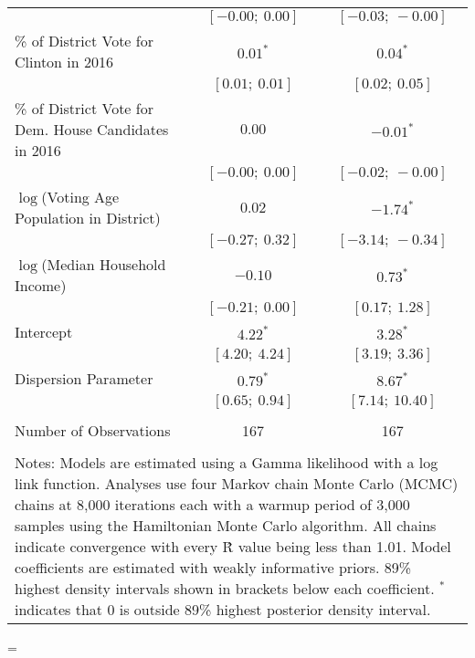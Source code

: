 \begin{table}
\begin{center}
{{\begin{tabular}{@{\extracolsep{5pt}}l c c }
          & $[-0.00;\ 0.00]$  & $[-0.03;\ -0.00]$ \\
\quad \% of District Vote for Clinton in 2016  & $0.01^{*}$        & $0.04^{*}$        \\
          & $[0.01;\ 0.01]$   & $[0.02;\ 0.05]$   \\
\quad \% of District Vote for Dem. House Candidates in 2016  & $0.00$            & $-0.01^{*}$       \\
          & $[-0.00;\ 0.00]$  & $[-0.02;\ -0.00]$ \\
\quad $\log$(Voting Age Population in District)   & $0.02$            & $-1.74^{*}$       \\
          & $[-0.27;\ 0.32]$  & $[-3.14;\ -0.34]$ \\
\quad $\log$(Median Household Income)    & $-0.10$           & $0.73^{*}$        \\
          & $[-0.21;\ 0.00]$  & $[0.17;\ 1.28]$   \\
\quad Intercept         & $4.22^{*}$        & $3.28^{*}$        \\
          & $[4.20;\ 4.24]$   & $[3.19;\ 3.36]$   \\
Dispersion Parameter     & $0.79^{*}$        & $8.67^{*}$        \\
          & $[0.65;\ 0.94]$   & $[7.14;\ 10.40]$  \\
\midrule  \\[-1.8ex]
Number of Observations & 167 & 167 \\
\bottomrule  \\[-1.8ex]
\multicolumn{3}{p{\linewidth}}{Notes: Models are estimated using a Gamma likelihood with a log link function. Analyses use four Markov chain Monte Carlo (MCMC) chains at 8,000 iterations each with a warmup period of 3,000 samples using the Hamiltonian Monte Carlo algorithm. All chains indicate convergence with every \^{R} value being less than 1.01. Model coefficients are estimated with weakly informative priors. 89\% highest density intervals shown in brackets below each coefficient. $^*$ indicates that 0 is outside 89\% highest posterior density interval.}
\end{tabular}}
=\hbox{\contents}
	\setlength{\linewidth}{\wd0-2\tabcolsep-.25em}
	\contents
}
\end{center}
\end{table}
